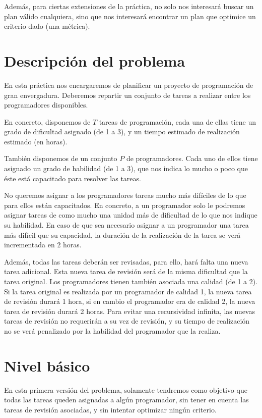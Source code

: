 \documentclass[11pt]{article}
\begin{document}
Además, para ciertas extensiones de la práctica, no solo nos interesará buscar un plan válido cualquiera, sino que nos interesará encontrar un plan que optimice un criterio dado (una métrica).

\newpage

\section{Descripción del problema}
En esta práctica nos encargaremos de planificar un proyecto de programación de gran envergadura.
Deberemos repartir un conjunto de tareas a realizar entre los programadores disponibles.

En concreto, disponemos de $T$ tareas de programación, cada una de ellas tiene un grado de dificultad asignado (de 1 a 3), y un tiempo estimado de realización estimado (en horas).

También disponemos de un conjunto $P$ de programadores. Cada uno de ellos tiene asignado un grado de habilidad (de 1 a 3), que nos indica lo mucho o poco que éste está capacitado para resolver las tareas.

No queremos asignar a los programadores tareas mucho más difíciles de lo que para ellos están capacitados. En concreto, a un programador solo le podremos asignar tareas de como mucho una unidad más de dificultad de lo que nos indique su habilidad. En caso de que sea necesario asignar a un programador una tarea más difícil que su capacidad, la duración de la realización de la tarea se verá incrementada en 2 horas.

Además, todas las tareas deberán ser revisadas, para ello, hará falta una nueva tarea adicional. Esta nueva tarea de revisión será de la misma dificultad que la tarea original.
Los programadores tienen también asociada una calidad (de 1 a 2). Si la tarea original es realizada por un programador de calidad 1, la nueva tarea de revisión durará 1 hora, si en cambio el programador era de calidad 2, la nueva tarea de revisión durará 2 horas. 
Para evitar una recursividad infinita, las nuevas tareas de revisión no requerirán a su vez de revisión, y su tiempo de realización no se verá penalizado por la habilidad del programador que la realiza.

\newpage

\section{Nivel básico} \label{basic}
En esta primera versión del problema, solamente tendremos como objetivo que todas las tareas queden asignadas a algún programador, sin tener en cuenta las tareas de revisión asociadas, y sin intentar optimizar ningún criterio.
\end{document}
